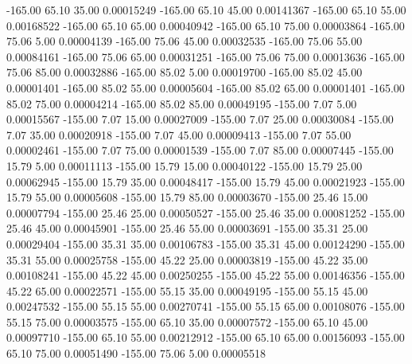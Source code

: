    -165.00     65.10     35.00     0.00015249
   -165.00     65.10     45.00     0.00141367
   -165.00     65.10     55.00     0.00168522
   -165.00     65.10     65.00     0.00040942
   -165.00     65.10     75.00     0.00003864
   -165.00     75.06      5.00     0.00004139
   -165.00     75.06     45.00     0.00032535
   -165.00     75.06     55.00     0.00084161
   -165.00     75.06     65.00     0.00031251
   -165.00     75.06     75.00     0.00013636
   -165.00     75.06     85.00     0.00032886
   -165.00     85.02      5.00     0.00019700
   -165.00     85.02     45.00     0.00001401
   -165.00     85.02     55.00     0.00005604
   -165.00     85.02     65.00     0.00001401
   -165.00     85.02     75.00     0.00004214
   -165.00     85.02     85.00     0.00049195
   -155.00      7.07      5.00     0.00015567
   -155.00      7.07     15.00     0.00027009
   -155.00      7.07     25.00     0.00030084
   -155.00      7.07     35.00     0.00020918
   -155.00      7.07     45.00     0.00009413
   -155.00      7.07     55.00     0.00002461
   -155.00      7.07     75.00     0.00001539
   -155.00      7.07     85.00     0.00007445
   -155.00     15.79      5.00     0.00011113
   -155.00     15.79     15.00     0.00040122
   -155.00     15.79     25.00     0.00062945
   -155.00     15.79     35.00     0.00048417
   -155.00     15.79     45.00     0.00021923
   -155.00     15.79     55.00     0.00005608
   -155.00     15.79     85.00     0.00003670
   -155.00     25.46     15.00     0.00007794
   -155.00     25.46     25.00     0.00050527
   -155.00     25.46     35.00     0.00081252
   -155.00     25.46     45.00     0.00045901
   -155.00     25.46     55.00     0.00003691
   -155.00     35.31     25.00     0.00029404
   -155.00     35.31     35.00     0.00106783
   -155.00     35.31     45.00     0.00124290
   -155.00     35.31     55.00     0.00025758
   -155.00     45.22     25.00     0.00003819
   -155.00     45.22     35.00     0.00108241
   -155.00     45.22     45.00     0.00250255
   -155.00     45.22     55.00     0.00146356
   -155.00     45.22     65.00     0.00022571
   -155.00     55.15     35.00     0.00049195
   -155.00     55.15     45.00     0.00247532
   -155.00     55.15     55.00     0.00270741
   -155.00     55.15     65.00     0.00108076
   -155.00     55.15     75.00     0.00003575
   -155.00     65.10     35.00     0.00007572
   -155.00     65.10     45.00     0.00097710
   -155.00     65.10     55.00     0.00212912
   -155.00     65.10     65.00     0.00156093
   -155.00     65.10     75.00     0.00051490
   -155.00     75.06      5.00     0.00005518
